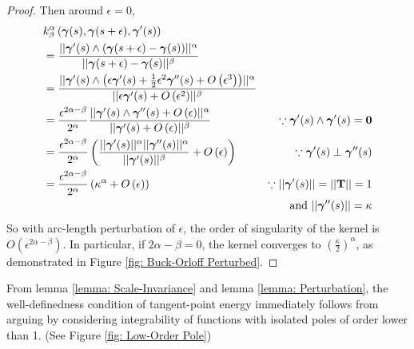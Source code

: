 \documentclass[../dissertation.tex]{subfiles}
\begin{document}
\begin{lemma}
\begin{proof}
        Then around $\epsilon = 0$,
        \begin{align*}
            & k_{\beta}^{\alpha} \left( \boldsymbol{\gamma}(s), \boldsymbol{\gamma}(s + \epsilon), \boldsymbol{\gamma}'(s) \right)
            \\
            &= 
            \frac{\lvert \lvert \boldsymbol{\gamma}'(s) \wedge \left( \boldsymbol{\gamma}(s+\epsilon) - \boldsymbol{\gamma}(s) \right) \rvert \rvert^{\alpha}}{\lvert \lvert \boldsymbol{\gamma}(s+\epsilon) - \boldsymbol{\gamma}(s) \rvert \rvert^{\beta}} \\
            &= 
            \frac{\lvert \lvert \boldsymbol{\gamma}'(s) \wedge \left( \epsilon \boldsymbol{\gamma}'(s) + \frac{1}{2} \epsilon^2 \boldsymbol{\gamma}''(s) + O\left( \epsilon^3 \right) \right) \rvert \rvert^{\alpha}}{\lvert \lvert \epsilon \boldsymbol{\gamma}'(s) + O \left( \epsilon^2 \right) \rvert \rvert^{\beta}} \\
            &=
            \frac{\epsilon^{2\alpha - \beta}}{2^{\alpha}}
            \frac{\lvert \lvert \boldsymbol{\gamma}'(s) \wedge \boldsymbol{\gamma}''(s) + O\left( \epsilon \right) \rvert \rvert^{\alpha}}{\lvert \lvert \boldsymbol{\gamma}'(s) + O \left( \epsilon \right) \rvert \rvert^{\beta}}
            &
            \because \boldsymbol{\gamma}'(s) \wedge \boldsymbol{\gamma}'(s) = \mathbf{0}
            \\
            &= 
            \frac{\epsilon^{2\alpha - \beta}}{2^{\alpha}}
            \left( \frac{\lvert \lvert \boldsymbol{\gamma}'(s) \rvert \rvert^{\alpha}\lvert \lvert \boldsymbol{\gamma}''(s) \rvert \rvert^{\alpha}}{\lvert \lvert \boldsymbol{\gamma}'(s) \rvert \rvert^{\beta}} + O \left( \epsilon \right) \right)
            &
            \because \boldsymbol{\gamma}'(s) \perp \boldsymbol{\gamma}''(s)
            \\
            &= 
            \frac{\epsilon^{2\alpha - \beta}}{2^{\alpha}}
            \left( \kappa^{\alpha} + O \left( \epsilon \right) \right)
            &
            \because \lvert \lvert \boldsymbol{\gamma}'(s) \rvert \rvert = \lvert \lvert \mathbf{T} \rvert \rvert=1
            \\
            &&\text{and } \lvert \lvert \boldsymbol{\gamma}''(s) \rvert \rvert = \kappa
        \end{align*}
        So with arc-length perturbation of $\epsilon$, the order of singularity of the kernel is $O \left( \epsilon^{2\alpha - \beta} \right)$. In particular, if $2\alpha - \beta = 0$, the kernel converges to $\left( \frac{\kappa}{2} \right)^{\alpha}$,
        as demonstrated in Figure \ref{fig: Buck-Orloff Perturbed}.
    \end{proof}
\end{lemma}

From lemma \ref{lemma: Scale-Invariance} and lemma \ref{lemma: Perturbation}, the well-definedness condition of tangent-point energy immediately follows from arguing by considering integrability of functions with isolated poles of order lower than 1.
(See Figure \ref{fig: Low-Order Pole})
\end{document}
